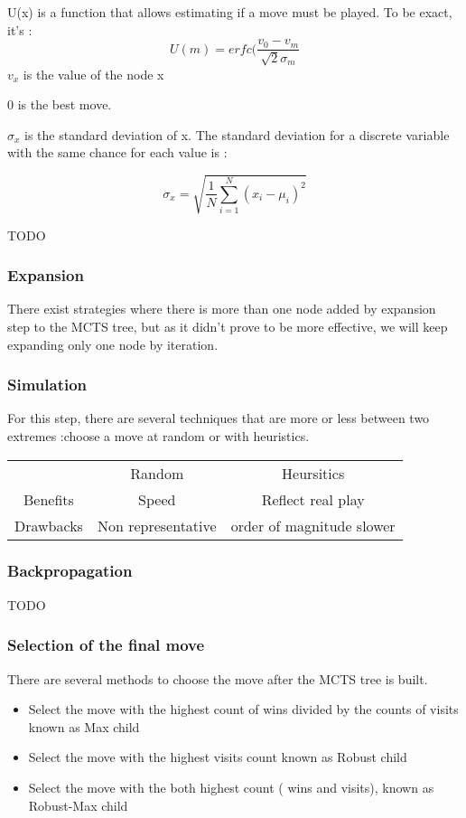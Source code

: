U(x) is a function that allows estimating if a move must be played. To be exact, it's : 
$$
U(m) = erfc(\frac{v_0 -v_m}{\sqrt{2}\sigma_m}
$$
$v_x$ is the value of the node x

0 is the best move. 

$\sigma_x$ is the standard deviation of x. The standard deviation for a discrete variable with the same chance for each value is : 

$$ 
\sigma_x 	= \sqrt{\frac{1}{N} \sum\limits_{i=1}^{N} (x_i-\mu_i)^2}
$$

TODO

\subsubsection{Expansion}
There exist strategies where there is more than one node added by expansion step to the MCTS tree, but as it didn't prove to be more effective, we will keep expanding only one node by iteration.

\subsubsection{Simulation}
For this step, there are several techniques that are more or less between two extremes :choose a move at random or with heuristics. 

\begin{tabular}{ccc}
    & Random & Heursitics \\
   Benefits & Speed & Reflect real play \\
   Drawbacks & Non representative & order of magnitude slower \\
\end{tabular}

\subsubsection{Backpropagation}

TODO

\subsubsection{Selection of the final move}
There are several methods to choose the move after the MCTS tree is built. 

\begin{itemize}
\item Select the move with the highest count of wins divided by the counts of visits known as Max child
\item Select the move with the highest visits count known as Robust child
\item Select the move with the both highest count ( wins and visits), known as Robust-Max child
\end{itemize}

